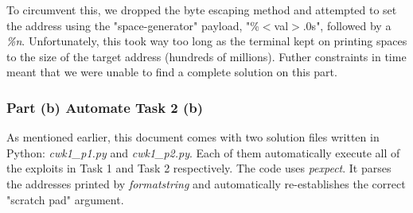 To circumvent this, we dropped the byte escaping method and attempted to set the address using the "space-generator" payload, "\%$<$val$>$.0s", followed by a \emph{\%n}. Unfortunately, this took way too long as the terminal kept on printing spaces to the size of the target address (hundreds of millions). Futher constraints in time meant that we were unable to find a complete solution on this part.

\subsubsection{Part (b) Automate Task 2 (b)}
As mentioned earlier, this document comes with two solution files written in Python: \emph{cwk1\_p1.py} and \emph{cwk1\_p2.py}. Each of them automatically execute all of the exploits in Task 1 and Task 2 respectively. The code uses \emph{pexpect}. It parses the addresses printed by \emph{formatstring} and automatically re-establishes the correct "scratch pad" argument.